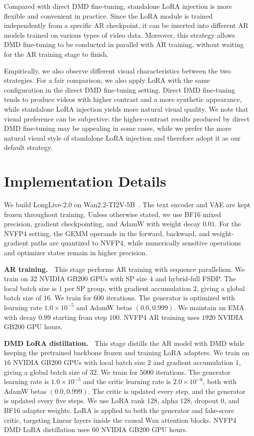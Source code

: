 \documentclass{llmxive}
\begin{document}
Compared with direct DMD fine-tuning, standalone LoRA injection is more flexible and convenient in practice. Since the LoRA module is trained independently from a specific AR checkpoint, it can be inserted into different AR models trained on various types of video data. Moreover, this strategy allows DMD fine-tuning to be conducted in parallel with AR training, without waiting for the AR training stage to finish. 

Empirically, we also observe different visual characteristics between the two strategies. For a fair comparison, we also apply LoRA with the same configuration in the direct DMD fine-tuning setting. Direct DMD fine-tuning tends to produce videos with higher contrast and a more synthetic appearance, while standalone LoRA injection yields more natural visual quality. 
We note that visual preference can be subjective: the higher-contrast results produced by direct DMD fine-tuning may be appealing in some cases, while we prefer the more natural visual style of standalone LoRA injection and therefore adopt it as our default strategy.

\section{Implementation Details}\label{ap:implementation_details}

We build LongLive-2.0 on Wan2.2-TI2V-5B~\cite{wan}. The text encoder and VAE are kept frozen throughout training. Unless otherwise stated, we use BF16 mixed precision, gradient checkpointing, and AdamW with weight decay $0.01$. For the NVFP4 setting, the GEMM operands in the forward, backward, and weight-gradient paths are quantized to NVFP4, while numerically sensitive operations and optimizer states remain in higher precision.

\textbf{AR training.} $\;$
This stage performs AR training with sequence parallelism. 
We train on $32$ NVIDIA GB200 GPUs with SP size $4$ and hybrid-full FSDP.
The local batch size is $1$ per SP group, with gradient accumulation $2$, giving a global batch size of $16$.
We train for $600$ iterations.
The generator is optimized with learning rate $1.0{\times}10^{-5}$ and AdamW betas $(0.0,0.999)$. We maintain an EMA with decay $0.99$ starting from step $100$.
NVFP4 AR training uses $1920$ NVIDIA GB200 GPU hours.

\textbf{DMD LoRA distillation.} $\;$
This stage distills the AR model with DMD while keeping the pretrained backbone frozen and training LoRA adapters. 
We train on $16$ NVIDIA GB200 GPUs with local batch size $2$ and gradient accumulation $1$, giving a global batch size of $32$.
We train for $5000$ iterations. 
The generator learning rate is $1.0{\times}10^{-5}$ and the critic learning rate is $2.0{\times}10^{-6}$, both with AdamW betas $(0.0,0.999)$. 
The critic is updated every step, and the generator is updated every five steps. 
We use LoRA rank $128$, alpha $128$, dropout $0$, and BF16 adapter weights. 
LoRA is applied to both the generator and fake-score critic, targeting Linear layers inside the causal Wan attention blocks.
NVFP4 DMD LoRA distillation uses $60$ NVIDIA GB200 GPU hours.

\end{document}
